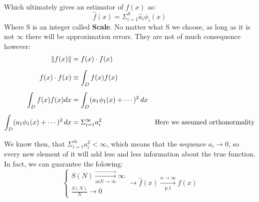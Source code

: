 Which ultimately gives an estimator of $f(x)$ as:
 \begin{equation}
     \hat{f}(x) = \Sigma_{i=1}^{S} \hat{a}_i\phi_i(x)
\end{equation}
Where S is an integer called \textbf{Scale}. No matter what S we choose, as long as it is not $\infty$ there will be approximation errors. They are not of much consequence however:
\begin{equation}
    \begin{aligned}
        \lVert f(x)\rVert&=f(x)\cdot f(x)&\mbox{}\\[1.25ex]
        f(x)\cdot f(x)&\equiv \int_D f(x)f(x)&\mbox{}\\[1.25ex]
        \int_D f(x) f(x) dx&=\int_D(a_1\phi_1(x)+\cdots )^{2}\,dx&\mbox{}\\[1.25ex]
        \int_D(a_1\phi_1(x)+\cdots )^{2}\,dx&=\Sigma^{\infty}_{i=1}a_i^{2}&\mbox{Here we assumed orthonormality}\\[1.25ex]
    \end{aligned}
\end{equation}
We know then, that $\Sigma^{\infty}_{i=1}a_i^{2} < \infty$, which means that the sequence $a_i \to 0$, so every new element of it will add less and less information about the true function.
In fact, we can guarantee the folowing:
\begin{equation}
    \begin{cases}
        S(N) \xrightarrow[\text{as} N \to \infty]{\longrightarrow} \infty\\
        \frac{S(N)}{N} \to 0
    \end{cases} \rightarrow  \hat{f}(x) \xrightarrow[\text{p.1}]{n \to \infty} f(x)
\end{equation}


